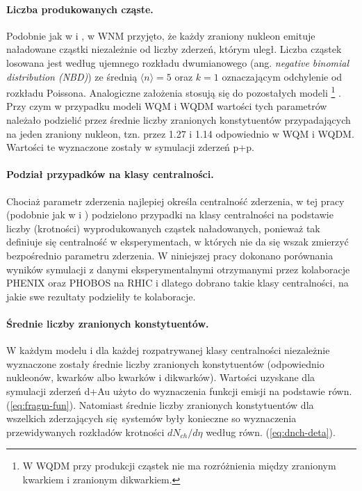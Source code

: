 \documentclass[a4paper,12pt]{article}
\begin{document}
\paragraph{Liczba produkowanych cząste.}
Podobnie jak w \cite{Barej:pracaInz18} i \cite{Barej:2017kcw}, w WNM przyjęto, że każdy zraniony nukleon emituje naładowane cząstki niezależnie od liczby zderzeń, którym uległ. Liczba cząstek losowana jest według ujemnego rozkładu dwumianowego (ang. \textit{negative binomial distribution (NBD)}) ze średnią $\langle n \rangle = 5$ oraz $k = 1$ oznaczającym odchylenie od rozkładu Poissona. Analogiczne założenia stosują się do pozostałych modeli \footnote{W WQDM przy produkcji cząstek nie ma rozróżnienia między zranionym kwarkiem i zranionym dikwarkiem.} . Przy czym w przypadku modeli WQM i WQDM wartości tych parametrów należało podzielić przez średnie liczby zranionych konstytuentów przypadających na jeden zraniony nukleon, tzn. przez 1.27 i 1.14 odpowiednio w WQM i WQDM. Wartości te wyznaczone zostały w symulacji zderzeń p+p.

\paragraph{Podział przypadków na klasy centralności.}
Chociaż parametr zderzenia najlepiej określa centralność zderzenia, w tej pracy (podobnie jak w \cite{Barej:pracaInz18} i \cite{Barej:2017kcw}) podzielono przypadki na klasy centralności na podstawie liczby (krotności) wyprodukowanych cząstek naładowanych, ponieważ tak definiuje się centralność w eksperymentach, w których nie da się wszak zmierzyć bezpośrednio parametru zderzenia. W niniejszej pracy dokonano porównania wyników symulacji z danymi eksperymentalnymi otrzymanymi przez kolaboracje PHENIX oraz PHOBOS na RHIC i dlatego dobrano takie klasy centralności, na jakie swe rezultaty podzieliły te kolaboracje.

\paragraph{Średnie liczby zranionych konstytuentów.}
W każdym modelu i dla każdej rozpatrywanej klasy centralności niezależnie wyznaczone zostały średnie liczby zranionych konstytuentów (odpowiednio nukleonów, kwarków albo kwarków i dikwarków). Wartości uzyskane dla symulacji zderzeń d+Au użyto do wyznaczenia funkcji emisji na podstawie równ. (\ref{eq:fragm-fun}). Natomiast średnie liczby zranionych konstytuentów dla wszelkich zderzających się systemów były konieczne so wyznaczenia przewidywanych rozkładów krotności $dN_{ch}/d\eta$ według równ. (\ref{eq:dnch-deta}).
\end{document}
